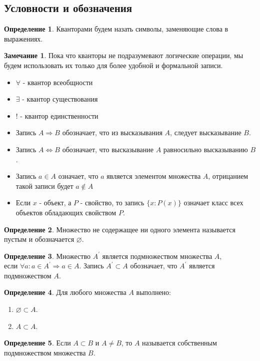 \documentclass[a4paper, 12pt]{article}
\newcommand{\lra}{\Leftrightarrow}
\renewcommand{\emptyset}{\varnothing}
\theoremstyle{definition}
\newtheorem*{definition}{Определение}
\newtheorem*{comm}{Замечание}
\begin{document}
    \subsection{Условности и обозначения}
        \begin{definition}
            Кванторами будем назать символы, заменяющие слова в выражениях.
        \end{definition}
        \begin{comm}
            Пока что кванторы не подразумевают логические операции, мы будем использовать их только для более удобной и формальной записи.
        \end{comm}
        \begin{itemize}
            \item $\forall$ - квантор всеобщности
            \item $\exists$ - квантор существования
            \item $!$ - квантор единственности
            \item Запись $A \Rightarrow B$ обозначает, что из высказывания $A$, следует высказывание $B$. 
            \item Запись $A \lra B$ обозначает, что высказывание $A$ равносильно высказыванию $B$.
            \item Запись $a \in A$ означает, что $a$ является элементом множества $A$, отрицанием такой записи будет $a \notin A$
            \item Если $x$ - объект, а $P$ - свойство, то запись $\{x : P(x)\}$ означает класс всех объектов обладающих свойством $P$.
        \end{itemize}
        \begin{definition}
            Множество не содержащее ни одного элемента называется пустым и обозначается $\emptyset$.
        \end{definition}
        \begin{definition}
            Множество $A^{\prime}$ является подмножеством множества $A$, \\ если $\forall a: a\in A^{\prime}\Rightarrow a\in A$. Запись $A^{\prime} \subset A$ обозначает, что $A^{\prime}$ является подмножеством $A$.
        \end{definition}        
        \begin{definition}
            Для любого множества $A$ выполнено:
            \begin{enumerate}
                \item $\emptyset \subset A$.
                \item $A \subset A$.
            \end{enumerate}
        \end{definition}
        \begin{definition}
            Если $A\subset B$ и $A\ne B$, то $A$ называется собственным подмножеством множества $B$.
        \end{definition}
\end{document}
